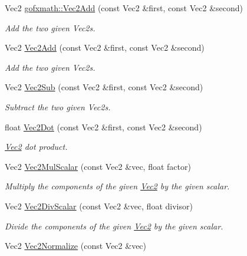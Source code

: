\begin{DoxyCompactItemize}
\item 
Vec2 \hyperlink{group___s_i_s_d_vec_math_gac9d2c898c69c771b9d9993a4c4f1a146}{gofxmath\+::\+Vec2\+Add} (const Vec2 \&first, const Vec2 \&second)
\begin{DoxyCompactList}\small\item\em Add the two given Vec2s. \end{DoxyCompactList}\item 
Vec2 \hyperlink{group___s_i_s_d_vec_math_gac9d2c898c69c771b9d9993a4c4f1a146}{Vec2\+Add} (const Vec2 \&first, const Vec2 \&second)
\begin{DoxyCompactList}\small\item\em Add the two given Vec2s. \end{DoxyCompactList}\item 
Vec2 \hyperlink{group___s_i_s_d_vec_math_gabc910528ba2f4f4c3b69bf432e5c7731}{Vec2\+Sub} (const Vec2 \&first, const Vec2 \&second)
\begin{DoxyCompactList}\small\item\em Subtract the two given Vec2s. \end{DoxyCompactList}\item 
float \hyperlink{group___s_i_s_d_vec_math_gaf722c71a1e9ef7bf97d9489b1cf561e0}{Vec2\+Dot} (const Vec2 \&first, const Vec2 \&second)
\begin{DoxyCompactList}\small\item\em \hyperlink{classgofxmath_1_1_vec2}{Vec2} dot product. \end{DoxyCompactList}\item 
Vec2 \hyperlink{group___s_i_s_d_vec_math_ga8e4fd4586284706a28625b0fca6c85e7}{Vec2\+Mul\+Scalar} (const Vec2 \&vec, float factor)
\begin{DoxyCompactList}\small\item\em Multiply the components of the given \hyperlink{classgofxmath_1_1_vec2}{Vec2} by the given scalar. \end{DoxyCompactList}\item 
Vec2 \hyperlink{group___s_i_s_d_vec_math_ga8686be4c3f0ee27b05363661fb75a228}{Vec2\+Div\+Scalar} (const Vec2 \&vec, float divisor)
\begin{DoxyCompactList}\small\item\em Divide the components of the given \hyperlink{classgofxmath_1_1_vec2}{Vec2} by the given scalar. \end{DoxyCompactList}\item 
Vec2 \hyperlink{group___s_i_s_d_vec_math_gaa0125e18e221531bfc7d72d47cdf42d9}{Vec2\+Normalize} (const Vec2 \&vec)

\end{DoxyCompactItemize}
